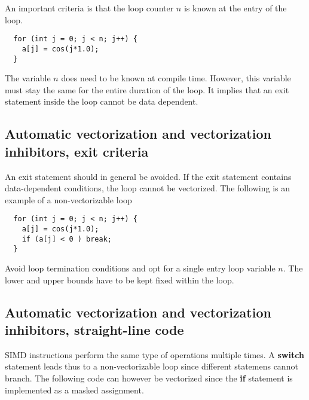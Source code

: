 \documentclass[%
oneside,                 %
final,                   %
10pt]{article}
\begin{document}
An important criteria is that the loop counter $n$ is known at the entry of the loop.




\begin{verbatim}
  for (int j = 0; j < n; j++) {
    a[j] = cos(j*1.0);
  }

\end{verbatim}

The variable $n$ does need to be known at compile time. However, this variable must stay the same for the entire duration of the loop. It implies that an exit statement inside the loop cannot be data dependent.

\subsection*{Automatic vectorization and vectorization inhibitors, exit criteria}

An exit statement should in general be avoided. 
If the exit statement contains data-dependent conditions, the loop cannot be vectorized. 
The following is an example of a non-vectorizable loop





\begin{verbatim}
  for (int j = 0; j < n; j++) {
    a[j] = cos(j*1.0);
    if (a[j] < 0 ) break;
  }

\end{verbatim}

Avoid loop termination conditions and opt for a single entry loop variable $n$. The lower and upper bounds have to be kept fixed within the loop. 

\subsection*{Automatic vectorization and vectorization inhibitors, straight-line code}

SIMD instructions perform the same type of operations multiple times. 
A \textbf{switch} statement leads thus to a non-vectorizable loop since different statemens cannot branch.
The following code can however be vectorized since the \textbf{if} statement is implemented as a masked assignment.
\end{document}

